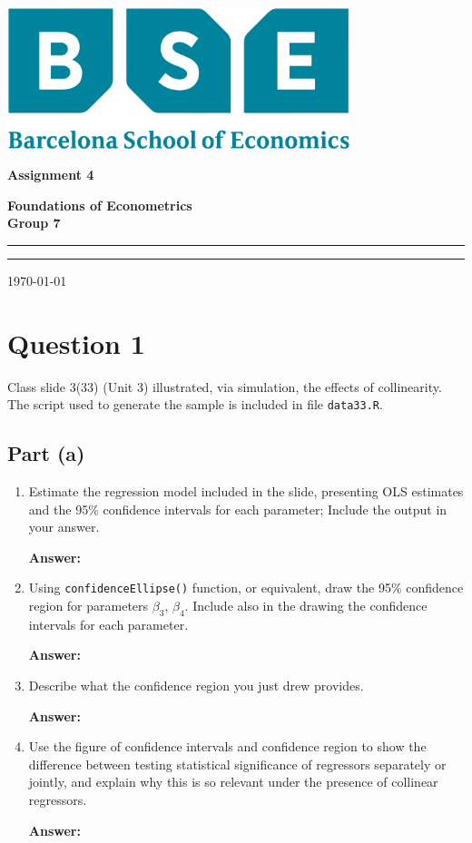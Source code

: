 \documentclass[12pt,a4paper]{article}
\begin{document}
\begin{titlepage}
\centering
\includegraphics[width=0.75\textwidth]{LaTex/imgs/bse_logo.pdf}
\par\vspace{0.75cm}
	{\huge\bfseries Assignment 4 \par}
    {\large\bfseries Foundations of Econometrics \\
                        Group 7\par}
	\vspace{0.25cm}
    \noindent\rule{\textwidth}{1pt}
    {\Large 
        \par}
    \noindent\rule{\textwidth}{1pt}
	\vfill
	{\large \today\par}
\end{titlepage}
\newpage

\section*{Question 1}
Class slide 3(33) (Unit 3) illustrated, via simulation, the effects of collinearity. The script used to generate the sample is included in file \texttt{data33.R}.

\subsection*{Part (a)}
\begin{enumerate}[label=(\roman*)]
  \item Estimate the regression model included in the slide, presenting OLS estimates and the 95\% confidence intervals for each parameter; Include the output in your answer.
  
  \textbf{Answer:} 
  
  \item Using \texttt{confidenceEllipse()} function, or equivalent, draw the 95\% confidence region for parameters $\beta_3$, $\beta_4$. Include also in the drawing the confidence intervals for each parameter.
  
  \textbf{Answer:} 
  
  \item Describe what the confidence region you just drew provides.
  
  \textbf{Answer:} 
  
  \item Use the figure of confidence intervals and confidence region to show the difference between testing statistical significance of regressors separately or jointly, and explain why this is so relevant under the presence of collinear regressors.
  
  \textbf{Answer:} 
\end{enumerate}
\end{document}
